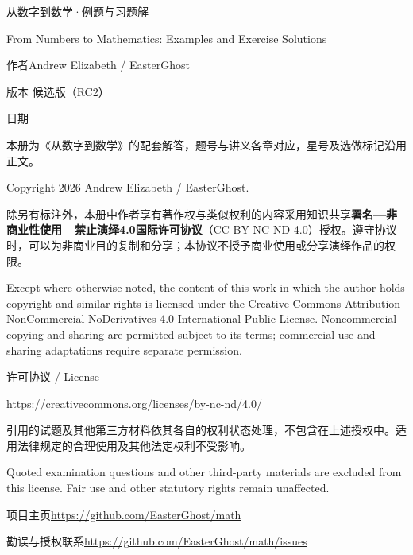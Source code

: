 \begingroup
\thispagestyle{empty}
\setlength{\parindent}{0pt}
\setlength{\parskip}{8pt}
\fontsize{10pt}{16pt}\selectfont
\vspace*{\fill}

{\heiti\fontsize{14pt}{20pt}\selectfont 从数字到数学·例题与习题解\par}
From Numbers to Mathematics: Examples and Exercise Solutions

作者\quad Andrew Elizabeth / EasterGhost\par
版本 候选版（RC2）\par
日期\quad \solutionsdate

本册为《从数字到数学》的配套解答，题号与讲义各章对应，星号及选做标记沿用正文。

Copyright \textcopyright{} 2026 Andrew Elizabeth / EasterGhost.

除另有标注外，本册中作者享有著作权与类似权利的内容采用知识共享\textbf{署名—非商业性使用—禁止演绎4.0国际许可协议}（CC BY-NC-ND 4.0）授权。遵守协议时，可以为非商业目的复制和分享；本协议不授予商业使用或分享演绎作品的权限。

Except where otherwise noted, the content of this work in which the author holds copyright and similar rights is licensed under the Creative Commons Attribution-NonCommercial-NoDerivatives 4.0 International Public License. Noncommercial copying and sharing are permitted subject to its terms; commercial use and sharing adaptations require separate permission.

许可协议 / License\par
\url{https://creativecommons.org/licenses/by-nc-nd/4.0/}

引用的试题及其他第三方材料依其各自的权利状态处理，不包含在上述授权中。适用法律规定的合理使用及其他法定权利不受影响。

Quoted examination questions and other third-party materials are excluded from this license. Fair use and other statutory rights remain unaffected.

项目主页\quad\url{https://github.com/EasterGhost/math}\par
勘误与授权联系\quad\url{https://github.com/EasterGhost/math/issues}

\endgroup
